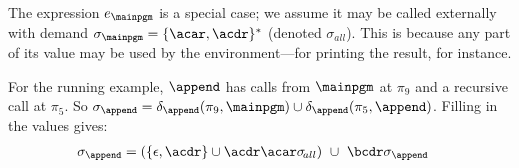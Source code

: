 \documentclass{llncs}
\begin{document}
The expression $e_{\mainpgm}$ is a special case; we assume it may be called externally
with demand $\sigma_\mainpgm = \{\acar,\acdr\}^\ast$ (denoted
$\sigma_{\!all}$).
This is because any  part  of its  value  may be  used  by  the environment---for
printing  the  result,  for  instance. 



% 
% 


For the running example, $\append$ has calls from $\mainpgm$ at $\pi_9$
and a recursive call at $\pi_5$.
So $\sigma_{\append} =
     \deltacall{\append}{\pi_9}{\mainpgm}  \cup \deltacall{\append}{\pi_5}{\append}$.
Filling in  the values gives:
\begin{align*}
\sigma_{\append}    &=
\left( \{\epsilon,  \acdr\} \cup  \acdr\acar\sigma_{\!all}  \right) ~\cup~
\bcdr\sigma_{\mathit{\append}}
\end{align*}
\end{document}
